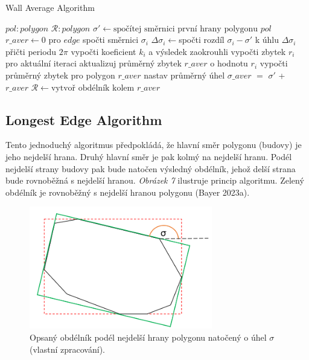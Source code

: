 \begin{algorithm}[h]
\caption{Wall Average Algorithm}\label{alg:cap}
\begin{algorithmic}
\Require $pol: polygon$
\Ensure $\mathcal{R}: polygon$
\State
\State $\sigma' \gets {\text{spočítej směrnici první hrany polygonu }} pol$
\State $r\_aver \gets 0$ 
\State
{}
    \State pro $edge$ spočti směrnici $\sigma_i$
    \State $\Delta\sigma_i \gets $spočti rozdíl $\sigma_i - \sigma'$
    \State
     
    \State k úhlu $\Delta\sigma_i$ přičti periodu $2\pi$
    \EndIf
    \State
    \State vypočti koeficient $k_i$ a výsledek zaokrouhli
    \State vypočti zbytek $r_i$ pro aktuální iteraci
    \State aktualizuj průměrný zbytek $r\_aver$ o hodnotu $r_i$
\EndFor
\State
\State vypočti průměrný zbytek pro polygon $r\_aver$
\State nastav průměrný úhel $\sigma\_aver$ $=$ $\sigma'$ + $r\_aver$
\State $\mathcal{R} \gets {\text{vytvoř obdélník kolem }} r\_aver$ 
\State 
{}

\end{algorithmic}
\end{algorithm}

\newpage

\subsection*{Longest Edge Algorithm}

\par Tento jednoduchý algoritmus předpokládá, že hlavní směr polygonu (budovy) je jeho nejdelší hrana. Druhý hlavní směr je pak kolmý na nejdelší hranu. Podél nejdelší strany budovy pak bude natočen výsledný obdélník, jehož delší strana bude rovnoběžná s nejdelší hranou. \emph{Obrázek 7} ilustruje princip algoritmu. Zelený obdélník je rovnoběžný s nejdelší hranou polygonu (Bayer 2023a).

\begin{figure}[h]
\centering
\includegraphics[width=8cm]{images/longest_edge.png}
    \caption{Opsaný obdélník podél nejdelší hrany polygonu natočený o úhel $\sigma$ (vlastní zpracování).}
\end{figure}

